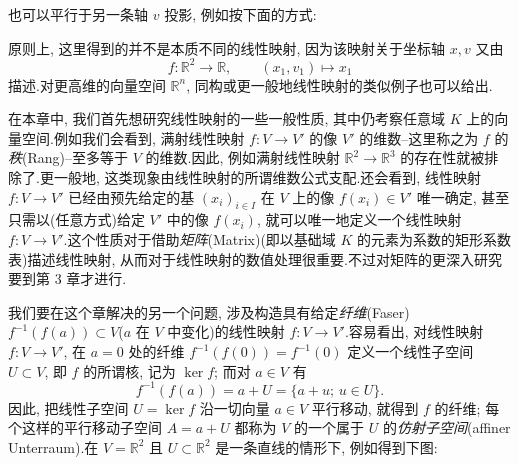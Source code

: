 也可以平行于另一条轴 $v$ 投影, 例如按下面的方式:

\begin{center}
\end{center}

原则上, 这里得到的并不是本质不同的线性映射, 因为该映射关于坐标轴 $x, v$ 又由
\[
f \colon \mathbb{R}^2 \longrightarrow \mathbb{R}, \qquad (x_1, v_1) \longmapsto x_1
\]
描述.对更高维的向量空间 $\mathbb{R}^n$, 同构或更一般地线性映射的类似例子也可以给出.

在本章中, 我们首先想研究线性映射的一些一般性质, 其中仍考察任意域 $K$ 上的向量空间.例如我们会看到, 满射线性映射 $f \colon V \longrightarrow V'$ 的像 $V'$ 的维数--这里称之为 $f$ 的\emph{秩}(\textup{Rang})--至多等于 $V$ 的维数.因此, 例如满射线性映射 $\mathbb{R}^2 \longrightarrow \mathbb{R}^3$ 的存在性就被排除了.更一般地, 这类现象由线性映射的所谓维数公式支配.还会看到, 线性映射 $f \colon V \longrightarrow V'$ 已经由预先给定的基 $(x_i)_{i \in I}$ 在 $V$ 上的像 $f(x_i) \in V'$ 唯一确定, 甚至只需以(任意方式)给定 $V'$ 中的像 $f(x_i)$, 就可以唯一地定义一个线性映射 $f \colon V \longrightarrow V'$.这个性质对于借助\emph{矩阵}(\textup{Matrix})(即以基础域 $K$ 的元素为系数的矩形系数表)描述线性映射, 从而对于线性映射的数值处理很重要.不过对矩阵的更深入研究要到第 3 章才进行.

我们要在这个章解决的另一个问题, 涉及构造具有给定\emph{纤维}(\textup{Faser}) $f^{-1}(f(a)) \subset V$($a$ 在 $V$ 中变化)的线性映射 $f \colon V \longrightarrow V'$.容易看出, 对线性映射 $f \colon V \longrightarrow V'$, 在 $a = 0$ 处的纤维 $f^{-1}(f(0)) = f^{-1}(0)$ 定义一个线性子空间 $U \subset V$, 即 $f$ 的所谓核, 记为 $\ker f$; 而对 $a \in V$ 有
\[
f^{-1}(f(a)) = a + U = \{a + u;\, u \in U\}\text{.}
\]
因此, 把线性子空间 $U = \ker f$ 沿一切向量 $a \in V$ 平行移动, 就得到 $f$ 的纤维; 每个这样的平行移动子空间 $A = a + U$ 都称为 $V$ 的一个属于 $U$ 的\emph{仿射子空间}(\textup{affiner Unterraum}).在 $V = \mathbb{R}^2$ 且 $U \subset \mathbb{R}^2$ 是一条直线的情形下, 例如得到下图:

